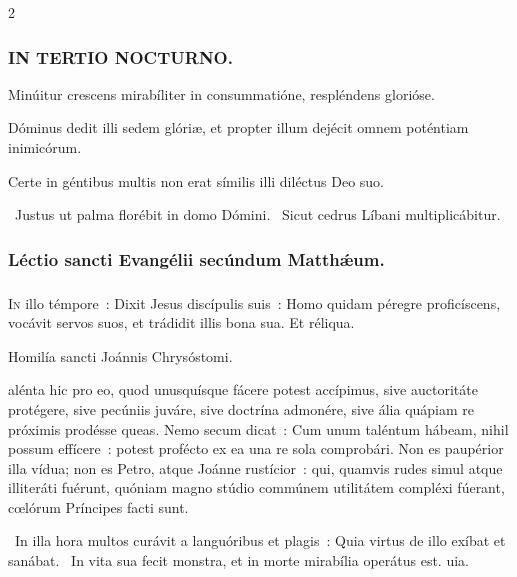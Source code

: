 \documentclass[9pt,twoside]{extarticle}
\begin{document}
\begin{multicols}{2}
{{{\subsubsection*{\center \textsc{IN TERTIO NOCTURNO.}}
\begin{tightlist}{}
\item {} Minúitur crescens mirabíliter in consummatióne, respléndens glorióse.
\item {} Dóminus dedit illi sedem glóriæ, et propter illum dejécit omnem poténtiam inimicórum.
\item {} Certe in géntibus multis non erat símilis illi diléctus Deo suo.
\item {}~Justus ut palma florébit in domo Dómini. ~Sicut cedrus Líbani multiplicábitur.
\end{tightlist}

\subsubsection*{\center Léctio sancti Evangélii secúndum Matthǽum.}
\subsubsection*{\center {} \hfill {}}
\lettrine{I}n illo témpore~: Dixit Jesus discípulis suis~: Homo quidam péregre proficíscens, vocávit servos suos, et trádidit illis bona sua. Et réliqua.

\begin{center}Homilía sancti Joánnis Chrysóstomi.\\
\end{center}
alénta hic pro eo, quod unusquísque fácere potest accípimus, sive auctoritáte protégere, sive pecúniis juváre, sive doctrína admonére, sive ália quápiam re próximis prodésse queas. Nemo secum dicat~: Cum unum taléntum hábeam, nihil possum effícere~: potest profécto ex ea una re sola comprobári. Non es paupérior illa vídua; non es Petro, atque Joánne rustícior~: qui, quamvis rudes simul atque illiteráti fuérunt, quóniam magno stúdio commúnem utilitátem compléxi fúerant, cœlórum Príncipes facti sunt.

\begin{tightlist}{}
\item {}~In illa hora multos curávit a languóribus et plagis~: \textred{*} Quia virtus de illo exíbat et sanábat. ~In vita sua fecit monstra, et in morte mirabília operátus est. uia.
\end{tightlist}

}}}
\end{multicols}
\end{document}

